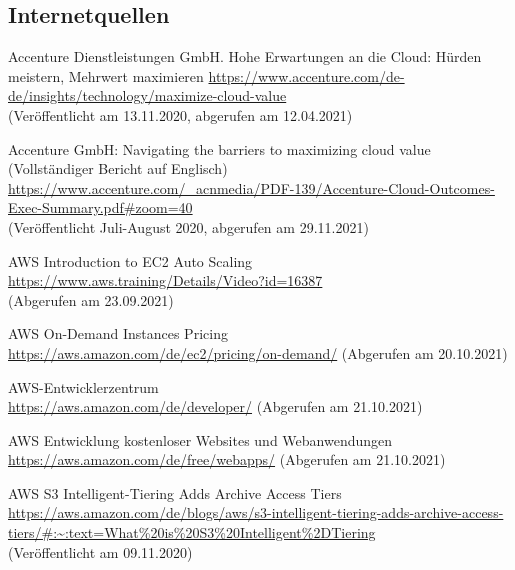 \subsection*{Internetquellen}
\begin{thebibliography}{HR08} %
  Accenture Dienstleistungen GmbH. Hohe Erwartungen an die Cloud: Hürden meistern, Mehrwert maximieren 
  \url{https://www.accenture.com/de-de/insights/technology/maximize-cloud-value}\\
  (Veröffentlicht am 13.11.2020, abgerufen am 12.04.2021)
  
  Accenture GmbH: Navigating the barriers to maximizing cloud value (Vollständiger Bericht auf Englisch)\\
  \url{https://www.accenture.com/_acnmedia/PDF-139/Accenture-Cloud-Outcomes-Exec-Summary.pdf#zoom=40}\\
  (Veröffentlicht Juli-August 2020, abgerufen am 29.11.2021)

  AWS Introduction to EC2 Auto Scaling\\
  \url{https://www.aws.training/Details/Video?id=16387}\\
  (Abgerufen am 23.09.2021)

  AWS On-Demand Instances Pricing \\
  \url{https://aws.amazon.com/de/ec2/pricing/on-demand/}
  (Abgerufen am 20.10.2021)

  AWS-Entwicklerzentrum \\
  \url{https://aws.amazon.com/de/developer/}
  (Abgerufen am 21.10.2021)

  AWS Entwicklung kostenloser Websites
  und Webanwendungen   \\
  \url{https://aws.amazon.com/de/free/webapps/}
  (Abgerufen am 21.10.2021)


   AWS S3 Intelligent-Tiering Adds Archive Access Tiers \\
  \url{https://aws.amazon.com/de/blogs/aws/s3-intelligent-tiering-adds-archive-access-tiers/#:~:text=What%20is%20S3%20Intelligent%2DTiering}\\
  (Veröffentlicht am 09.11.2020)


\end{thebibliography}
